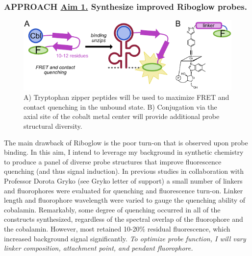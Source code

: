 \subsubsection*{APPROACH \underline{Aim 1.} Synthesize improved Riboglow probes.}
\begin{figure}
\begin{centering}
\includegraphics[width=\textwidth]{figures/aim1v3.pdf}

\end{centering}
\footnotesize
\caption{\label{figure:aim1}
A) Tryptophan zipper peptides will be used to maximize FRET and contact quenching in the unbound state. B) Conjugation via the axial site of the cobalt metal center will provide additional probe structural diversity.
}
\end{figure}
The main drawback of Riboglow is the poor turn-on that is observed upon probe binding. In this aim, I intend to leverage my background in synthetic chemistry to produce a panel of diverse probe structures that improve fluorescence quenching (and thus signal induction). In previous studies in collaboration with Professor Dorota Gryko (see Gryko letter of support) a small number of linkers and fluorophores were evaluated for quenching and fluorescence turn-on. Linker length and fluorophore wavelength were varied to gauge the quenching ability of cobalamin. Remarkably, some degree of quenching occurred in all of the constructs synthesized, regardless of the spectral overlap of the fluorophore and the cobalamin. However, most retained 10-20\% residual fluorescence, which increased background signal significantly. \textit{To optimize probe function, I will vary linker composition, attachment point, and pendant fluorophore.}

